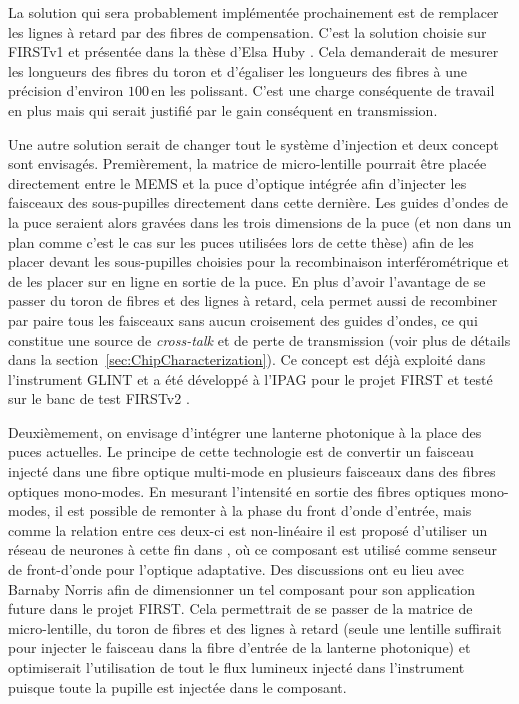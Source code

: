 La solution qui sera probablement implémentée prochainement est de remplacer les lignes à retard par des fibres de compensation. C'est la solution choisie sur \ac{FIRSTv1} et présentée dans la thèse d'Elsa Huby \citep{huby2013these}. Cela demanderait de mesurer les longueurs des fibres du toron et d'égaliser les longueurs des fibres à une précision d'environ $100 \,$\um en les polissant. C'est une charge conséquente de travail en plus mais qui serait justifié par le gain conséquent en transmission.

Une autre solution serait de changer tout le système d'injection et deux concept sont envisagés. Premièrement, la matrice de micro-lentille pourrait être placée directement entre le \ac{MEMS} et la puce d'optique intégrée afin d'injecter les faisceaux des sous-pupilles directement dans cette dernière. Les guides d'ondes de la puce seraient alors gravées dans les trois dimensions de la puce (et non dans un plan comme c'est le cas sur les puces utilisées lors de cette thèse) afin de les placer devant les sous-pupilles choisies pour la recombinaison interférométrique et de les placer sur en ligne en sortie de la puce. En plus d'avoir l'avantage de se passer du toron de fibres et des lignes à retard, cela permet aussi de recombiner par paire tous les faisceaux sans aucun croisement des guides d'ondes, ce qui constitue une source de \textit{cross-talk} et de perte de transmission (voir plus de détails dans la section~\ref{sec:ChipCharacterization}). Ce concept est déjà exploité dans l'instrument \ac{GLINT} \citep{martinod2021} et a été développé à l'\ac{IPAG} pour le projet \ac{FIRST} et testé sur le banc de test \ac{FIRSTv2} \citep{martin2022a}.

Deuxièmement, on envisage d'intégrer une lanterne photonique \citep{leonsaval2005} à la place des puces actuelles. Le principe de cette technologie est de convertir un faisceau injecté dans une fibre optique multi-mode en plusieurs faisceaux dans des fibres optiques mono-modes. En mesurant l'intensité en sortie des fibres optiques mono-modes, il est possible de remonter à la phase du front d'onde d'entrée, mais comme la relation entre ces deux-ci est non-linéaire il est proposé d'utiliser un réseau de neurones à cette fin dans \cite{norris2020}, où ce composant est utilisé comme senseur de front-d'onde pour l'optique adaptative. Des discussions ont eu lieu avec Barnaby Norris afin de dimensionner un tel composant pour son application future dans le projet \ac{FIRST}. Cela permettrait de se passer de la matrice de micro-lentille, du toron de fibres et des lignes à retard (seule une lentille suffirait pour injecter le faisceau dans la fibre d'entrée de la lanterne photonique) et optimiserait l'utilisation de tout le flux lumineux injecté dans l'instrument puisque toute la pupille est injectée dans le composant.


